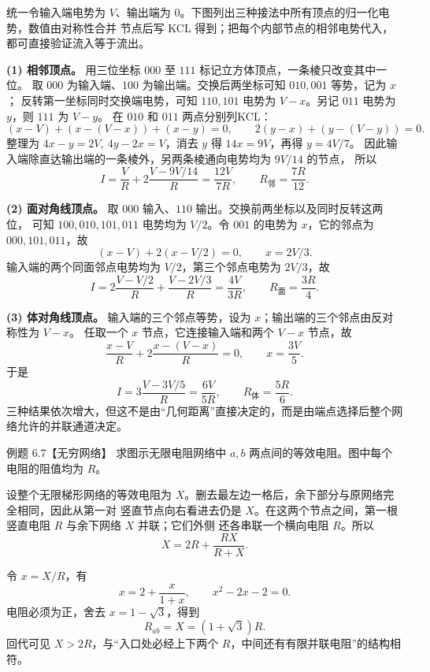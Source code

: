 \begin{xesolution}
统一令输入端电势为 $V$、输出端为 $0$。下图列出三种接法中所有顶点的归一化电势，数值由对称性合并
节点后写 KCL 得到；把每个内部节点的相邻电势代入，都可直接验证流入等于流出。

\cubePotentialFigure
{}

\textbf{(1) 相邻顶点。} 用三位坐标 $000$ 至 $111$ 标记立方体顶点，一条棱只改变其中一位。
取 $000$ 为输入端、$100$ 为输出端。交换后两坐标可知 $010,001$ 等势，记为 $x$；
反转第一坐标同时交换端电势，可知 $110,101$ 电势为 $V-x$。另记 $011$ 电势为 $y$，则 $111$ 为 $V-y$。
在 $010$ 和 $011$ 两点分别列KCL：
\[
 (x-V)+(x-(V-x))+(x-y)=0,\qquad
 2(y-x)+(y-(V-y))=0.
\]
整理为 $4x-y=2V,\ 4y-2x=V$，消去 $y$ 得 $14x=9V$，再得 $y=4V/7$。
因此输入端除直达输出端的一条棱外，另两条棱通向电势均为 $9V/14$ 的节点，
所以
\[
  I=\frac VR+2\frac{V-9V/14}{R}=\frac{12V}{7R},
  \qquad
  \boxed{R_{\text{邻}}=\frac{7R}{12}}.
\]

\textbf{(2) 面对角线顶点。} 取 $000$ 输入、$110$ 输出。交换前两坐标以及同时反转这两位，
可知 $100,010,101,011$ 电势均为 $V/2$。令 $001$ 的电势为 $x$，它的邻点为 $000,101,011$，故
\[
 (x-V)+2(x-V/2)=0,\qquad x=2V/3.
\]
输入端的两个同面邻点电势均为 $V/2$，第三个邻点电势为 $2V/3$，故
\[
  I=2\frac{V-V/2}{R}+\frac{V-2V/3}{R}=\frac{4V}{3R},
  \qquad
  \boxed{R_{\text{面}}=\frac{3R}{4}}.
\]

\textbf{(3) 体对角线顶点。} 输入端的三个邻点等势，设为 $x$；输出端的三个邻点由反对称性为 $V-x$。
任取一个 $x$ 节点，它连接输入端和两个 $V-x$ 节点，故
\[
  \frac{x-V}{R}+2\frac{x-(V-x)}R=0,
  \qquad x=\frac{3V}{5}.
\]
于是
\[
  I=3\frac{V-3V/5}{R}=\frac{6V}{5R},
  \qquad
  \boxed{R_{\text{体}}=\frac{5R}{6}}.
\]
三种结果依次增大，但这不是由“几何距离”直接决定的，而是由端点选择后整个网络允许的并联通道决定。
\end{xesolution}

\begin{origexamplebox}{例题 6.7【无穷网络】}
求图示无限电阻网络中 $a,b$ 两点间的等效电阻。图中每个电阻的阻值均为 $R$。
\infiniteLadderProblemFigure
{}
\end{origexamplebox}



\begin{xesolution}
设整个无限梯形网络的等效电阻为 $X$。删去最左边一格后，余下部分与原网络完全相同，因此从第一对
竖直节点向右看进去仍是 $X$。在这两个节点之间，第一根竖直电阻 $R$ 与余下网络 $X$ 并联；它们外侧
还各串联一个横向电阻 $R$。所以
\[
  X=2R+\frac{RX}{R+X}.
\]

\ladderRecursionFigure
{}

令 $x=X/R$，有
\[
  x=2+\frac{x}{1+x},
  \qquad x^2-2x-2=0.
\]
电阻必须为正，舍去 $x=1-\sqrt3$，得到
\[
  \boxed{R_{ab}=X=(1+\sqrt3)R}.
\]
回代可见 $X>2R$，与“入口处必经上下两个 $R$，中间还有有限并联电阻”的结构相符。
\end{xesolution}

